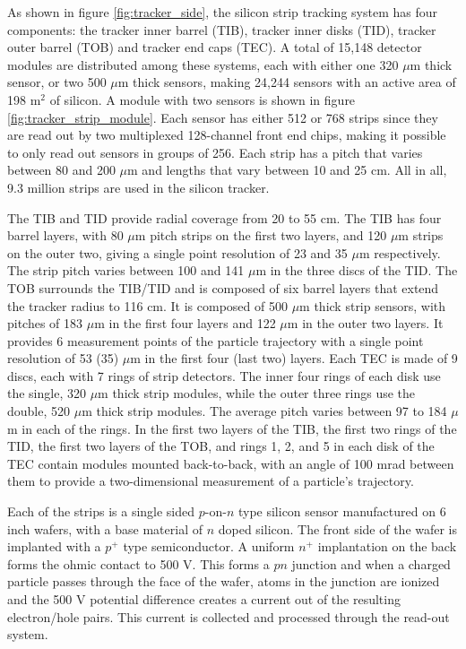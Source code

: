 \par As shown in figure \ref{fig:tracker_side}, the silicon strip
tracking system has four components: the tracker inner barrel (TIB),
tracker inner disks (TID), tracker outer barrel (TOB) and tracker end
caps (TEC).  A total of 15,148 detector modules are distributed among
these systems, each with either one 320 $\mu$m thick sensor, or two
500 $\mu$m thick sensors, making 24,244 sensors with an active area of
198 m$^{2}$ of silicon.  A module with two sensors is shown in figure
\ref{fig:tracker_strip_module}.  Each sensor has either 512 or 768 strips
since they are read out by two multiplexed 128-channel front end
chips, making it possible to only read out sensors in groups of 256.
Each strip has a pitch that varies between 80 and 200 $\mu$m and
lengths that vary between 10 and 25 cm.  All in all, 9.3 million
strips are used in the silicon tracker.  

\par The TIB and TID provide radial coverage from 20 to 55 cm.  The
TIB has four barrel layers, with 80 $\mu$m pitch strips on the first two
layers, and 120 $\mu$m strips on the outer two, giving a single point
resolution of 23 and 35 $\mu$m respectively.  The strip pitch varies
between 100 and 141 $\mu$m in the three discs of the TID.  The TOB
surrounds the TIB/TID and is composed of six barrel layers that extend
the tracker radius to 116 cm.  It is composed of 500 $\mu$m thick
strip sensors, with pitches of 183 $\mu$m in the first four layers and
122 $\mu$m in the outer two layers.  It provides 6 measurement points
of the particle trajectory with a single point resolution of 53 (35)
$\mu$m in the first four (last two) layers.  Each TEC is made of 9
discs, each with 7 rings of strip detectors.  The inner four rings of
each disk use the single, 320 $\mu$m thick strip modules, while the
outer three rings use the double, 520 $\mu$m thick strip modules.  The
average pitch varies between 97 to 184 $\mu$m in each of the rings.
In the first two layers of the TIB, the first two rings of the TID,
the first two layers of the TOB, and rings 1, 2, and 5 in each disk of
the TEC contain modules mounted back-to-back, with an angle of 100
mrad between them to provide a two-dimensional measurement of a
particle's trajectory.  

\par Each of the strips is a single sided $p$-on-$n$ type silicon
sensor manufactured on 6 inch wafers, with a base material of $n$
doped silicon.  The front side of the wafer is implanted with a
$p^{+}$ type semiconductor.  A uniform $n^{+}$ implantation on the
back forms the ohmic contact to 500 V.  This forms a $pn$ junction and
when a charged particle passes through the face of the wafer, atoms in
the junction are ionized and the 500 V potential difference creates a
current out of the resulting electron/hole pairs.  This current is
collected and processed through the read-out system.  

